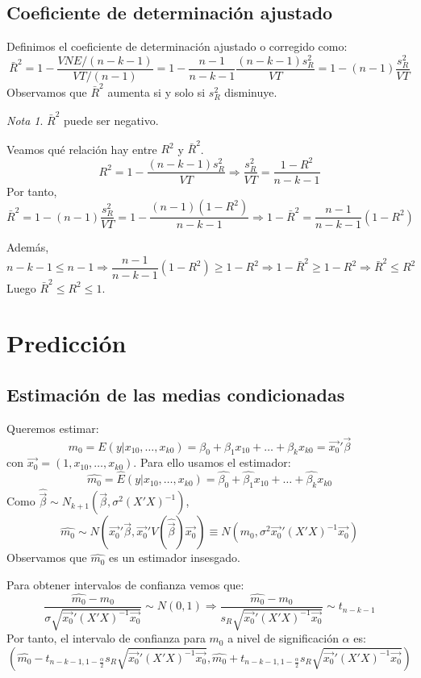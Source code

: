 \documentclass{report}
\theoremstyle{remark}
\theoremstyle{remark}
\newtheorem*{note}{Nota}
\theoremstyle{remark}
\theoremstyle{definition}
\theoremstyle{definition}
\theoremstyle{definition}
\begin{document}
\subsection*{Coeficiente de determinación ajustado}
Definimos el coeficiente de determinación ajustado o corregido como:
$$\bar{R}^2 = 1 - \frac{VNE/(n-k-1)}{VT/(n-1)} = 1 - \frac{n-1}{n-k-1}\frac{(n-k-1)s_R^2}{VT} = 1 - (n-1)\frac{s_R^2}{VT}$$
Observamos que $\bar{R}^2$ aumenta si y solo si $s_R^2$ disminuye.

\begin{note}
    $\bar{R}^2$ puede ser negativo.
\end{note}

Veamos qué relación hay entre $R^2$ y $\bar{R}^2$.
$$R^2 = 1 - \frac{(n-k-1)s_R^2}{VT} \Rightarrow \frac{s_R^2}{VT} = \frac{1-R^2}{n-k-1}$$
Por tanto,
$$\bar{R}^2 = 1 - (n-1)\frac{s_R^2}{VT} = 1 - \frac{(n-1)(1-R^2)}{n-k-1} \Rightarrow 1 - \bar{R}^2 = \frac{n-1}{n-k-1}(1 - R^2)$$

Además,
$$n-k-1 \leq n-1 \Rightarrow \frac{n-1}{n-k-1}(1-R^2) \geq 1 - R^2 \Rightarrow 1-\bar{R}^2 \geq 1-R^2 \Rightarrow \bar{R}^2 \leq R^2$$
Luego $\bar{R}^2 \leq R^2 \leq 1$.

\section{Predicción}
\subsection*{Estimación de las medias condicionadas}
Queremos estimar:
$$m_0 = E(y|x_{10}, \dots, x_{k0}) = \beta_0 + \beta_1x_{10} + \dots + \beta_kx_{k0} = \vec{x_0}'\vec{\beta}$$
con $\vec{x_0} = (1, x_{10}, \dots, x_{k0})$.
Para ello usamos el estimador:
$$\hat{m_0} = \hat{E}(y|x_{10}, \dots, x_{k0}) = \hat{\beta_0} + \hat{\beta_1}x_{10} + \dots + \hat{\beta_k}x_{k0}$$
Como $\hat{\vec{\beta}} \sim N_{k+1}(\vec{\beta}, \sigma^2(X'X)^{-1})$,
$$\hat{m_0} \sim N(\vec{x_0}'\vec{\beta}, \vec{x_0}'V(\hat{\vec{\beta}})\vec{x_0}) \equiv N(m_0, \sigma^2\vec{x_0}'(X'X)^{-1}\vec{x_0})$$
Observamos  que $\hat{m_0}$ es un estimador insesgado.

Para obtener intervalos de confianza vemos que:
$$\frac{\hat{m_0}-m_0}{\sigma\sqrt{\vec{x_0}'(X'X)^{-1}\vec{x_0}}} \sim N(0, 1) \Rightarrow \frac{\hat{m_0}-m_0}{s_R\sqrt{\vec{x_0}'(X'X)^{-1}\vec{x_0}}} \sim t_{n-k-1}$$
Por tanto, el intervalo de confianza para $m_0$ a nivel de significación $\alpha$ es:
$$\left( \hat{m_0} - t_{n-k-1, 1-\frac{\alpha}{2}} s_R\sqrt{\vec{x_0}'(X'X)^{-1}\vec{x_0}}, \hat{m_0} + t_{n-k-1, 1-\frac{\alpha}{2}} s_R\sqrt{\vec{x_0}'(X'X)^{-1}\vec{x_0}} \right)$$
\end{document}
